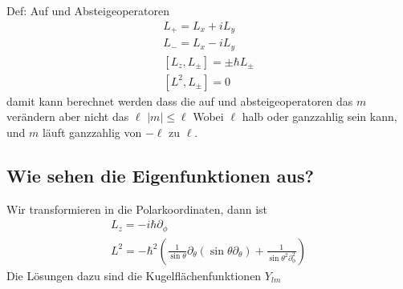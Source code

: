 Def: Auf und Absteigeoperatoren
\begin{gather}
	L_+ = L_x + iL_y\\
	L_- = L_x - iL_y\\
	[L_z, L_\pm] = \pm \hbar L_\pm\\
	[L^2, L_\pm] = 0
\end{gather}
damit kann berechnet werden dass die auf und absteigeoperatoren das $m$ verändern aber nicht das $\ell$
$|m|\leq\ell$ Wobei $\ell$ halb oder ganzzahlig sein kann, und $m$ läuft  ganzzahlig von $-\ell$ zu $\ell$.

\subsection{Wie sehen die Eigenfunktionen aus?}
Wir transformieren in die Polarkoordinaten, dann ist
\begin{gather}
	L_z = -i\hbar\partial_\phi\\
	L^2 = -\hbar^2\left(\frac{1}{\sin\theta}\partial_\theta\left(\sin\theta\partial_\theta\right)+ \frac{1}{\sin\theta^2\partial_\phi^2}\right)
\end{gather}
Die Lösungen dazu sind die Kugelflächenfunktionen $Y_{lm}$



